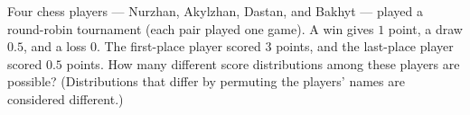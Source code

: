 Four chess players --- Nurzhan, Akylzhan, Dastan, and Bakhyt --- played a round-robin tournament (each pair played one game). A win gives $1$ point, a draw $0.5$, and a loss $0$. The first-place player scored $3$ points, and the last-place player scored $0.5$ points. How many different score distributions among these players are possible? (Distributions that differ by permuting the players' names are considered different.)
